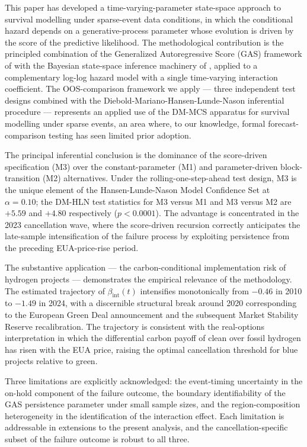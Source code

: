 \documentclass[12pt,a4paper]{article}
\newcommand{\bint}{\beta_{\text{int}}}
\theoremstyle{plain}
\theoremstyle{definition}
\begin{document}
This paper has developed a time-varying-parameter state-space approach to survival modelling under sparse-event data conditions, in which the conditional hazard depends on a generative-process parameter whose evolution is driven by the score of the predictive likelihood. The methodological contribution is the principled combination of the Generalized Autoregressive Score (GAS) framework of \cite{creal2013generalized} with the Bayesian state-space inference machinery of \cite{durbin2012time}, applied to a complementary log-log hazard model with a single time-varying interaction coefficient. The OOS-comparison framework we apply --- three independent test designs combined with the Diebold-Mariano-Hansen-Lunde-Nason inferential procedure --- represents an applied use of the DM-MCS apparatus for survival modelling under sparse events, an area where, to our knowledge, formal forecast-comparison testing has seen limited prior adoption.

The principal inferential conclusion is the dominance of the score-driven specification (M3) over the constant-parameter (M1) and parameter-driven block-transition (M2) alternatives. Under the rolling-one-step-ahead test design, M3 is the unique element of the Hansen-Lunde-Nason Model Confidence Set at $\alpha = 0.10$; the DM-HLN test statistics for M3 versus M1 and M3 versus M2 are $+5.59$ and $+4.80$ respectively ($p < 0.0001$). The advantage is concentrated in the 2023 cancellation wave, where the score-driven recursion correctly anticipates the late-sample intensification of the failure process by exploiting persistence from the preceding EUA-price-rise period.

The substantive application --- the carbon-conditional implementation risk of hydrogen projects --- demonstrates the empirical relevance of the methodology. The estimated trajectory of $\bint(t)$ intensifies monotonically from $-0.46$ in 2010 to $-1.49$ in 2024, with a discernible structural break around 2020 corresponding to the European Green Deal announcement and the subsequent Market Stability Reserve recalibration. The trajectory is consistent with the real-options interpretation in which the differential carbon payoff of clean over fossil hydrogen has risen with the EUA price, raising the optimal cancellation threshold for blue projects relative to green.

Three limitations are explicitly acknowledged: the event-timing uncertainty in the on-hold component of the failure outcome, the boundary identifiability of the GAS persistence parameter under small sample sizes, and the region-composition heterogeneity in the identification of the interaction effect. Each limitation is addressable in extensions to the present analysis, and the cancellation-specific subset of the failure outcome is robust to all three.
\end{document}
